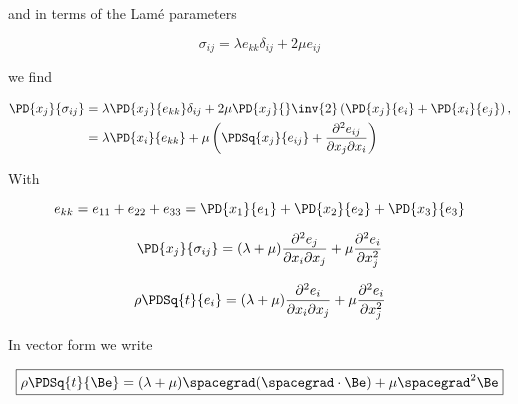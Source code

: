 and in terms of the Lam\'e parameters

\begin{equation}\label{eqn:continuumL6:210}
\sigma_{ij} = \lambda e_{kk} \delta_{ij} + 2 \mu e_{ij}
\end{equation}

we find

\begin{align*}
\PD{x_j}{\sigma_{ij}}
&=
\lambda 
\PD{x_j}{
e_{kk}
}
\delta_{ij} + 2 \mu 
\PD{x_j}{
}
\inv{2} \left( 
\PD{x_j}{e_i}
+ \PD{x_i}{e_j} \right),
 \\
&=
\lambda 
\PD{x_i}{
e_{kk}
}
+ \mu 
\left(
\PDSq{x_j}{
e_{ij}
}
+
\frac{\partial^2 e_{ij} }{ \partial x_j \partial x_i}
\right)
\end{align*}

With 

\begin{equation}\label{eqn:continuumL6:230}
e_{kk} = e_{11} +e_{22} +e_{33}
= 
\PD{x_1}{e_1}
+\PD{x_2}{e_2}
+\PD{x_3}{e_3}
\end{equation}

\begin{equation}\label{eqn:continuumL6:250}
\PD{x_j}{\sigma_{ij}} = (\lambda + \mu) \frac{\partial^2 e_j}{\partial x_i \partial x_j}
+ \mu
\frac{\partial^2 e_i}
{\partial x_j^2
}
\end{equation}

\begin{equation}\label{eqn:continuumL6:270}
\rho \PDSq{t}{e_i} = (\lambda + \mu) \frac{\partial^2 e_i}{\partial x_i \partial x_j}
+ \mu
\frac{\partial^2 e_i}
{\partial x_j^2
}
\end{equation}

In vector form we write

\begin{equation}\label{eqn:continuumL6:290}
\boxed{
\rho \PDSq{t}{\Be} = (\lambda + \mu) \spacegrad (\spacegrad \cdot \Be) + \mu \spacegrad^2 \Be
}
\end{equation}

\EndArticle

